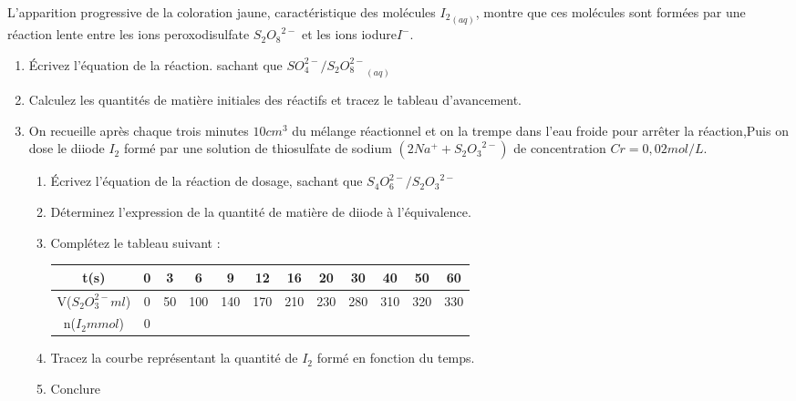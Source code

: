 \documentclass[12pt]{article}
\begin{document}
L'apparition progressive de la coloration jaune, caractéristique des molécules ${I_2}_{(aq)}$, montre que ces molécules sont formées par une réaction lente entre les ions peroxodisulfate ${S_2O_8}^{2-}$ et les ions iodure$I^-$.

\begin{enumerate}
	\item Écrivez l'équation de la réaction. sachant que $SO_4^{2-}/{S_2O_8^{2-}}_{(aq)}$
	\item Calculez les quantités de matière initiales des réactifs et tracez le tableau d’avancement.
	\item On recueille après chaque trois minutes $10cm^3$ du mélange réactionnel et on la trempe dans l'eau froide pour arrêter la réaction,Puis on dose le diiode $I_2$ formé par une solution de thiosulfate de sodium $(2Na^+ + {S_2O_3}^{2-})$  de concentration $Cr= 0,02mol/L$.

	      \begin{enumerate}
		      \item  Écrivez l'équation de la réaction de dosage, sachant que $S_4O_6^{2-}/{S_2O_3}^{2-} $
		      \item Déterminez l'expression de la quantité de matière de diiode à l'équivalence.
		      \item Complétez le tableau suivant :
		            \begin{center}
			            \begin{tabular}{|c|c|c|c|c|c|c|c|c|c|c|c|}
				            \hline
				            t(s)                & 0 & 3  & 6   & 9   & 12  & 16  & 20  & 30  & 40  & 50  & 60  \\\hline
				            V($S_2O_3^{2-} ml$) & 0 & 50 & 100 & 140 & 170 & 210 & 230 & 280 & 310 & 320 & 330 \\\hline
				            n($I_2 mmol$)       & 0 &    &     &     &     &     &     &     &     &     &     \\\hline
			            \end{tabular}
		            \end{center}
		      \item Tracez la courbe représentant la quantité de $I_2$ formé en fonction du temps.
		      \item Conclure
	      \end{enumerate}

\end{enumerate}
\end{document}
